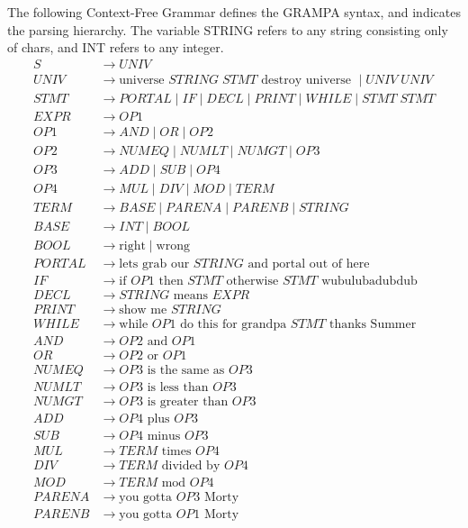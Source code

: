 \documentclass[numbers]{sigplanconf}
\begin{document}
The following Context-Free Grammar defines the GRAMPA syntax, and indicates the parsing hierarchy. The variable STRING refers to any string consisting only of chars, and INT refers to any integer.
\begin{align*}
	S &\rightarrow UNIV \\
	UNIV &\rightarrow \text{universe } STRING \; STMT \text{ destroy universe } \mid UNIV \; UNIV \\
	STMT &\rightarrow PORTAL \mid IF \mid DECL \mid PRINT \mid WHILE \mid STMT \; STMT \\
	EXPR &\rightarrow OP1 \\
	OP1 &\rightarrow AND \mid OR \mid OP2 \\
	OP2 &\rightarrow NUMEQ \mid NUMLT \mid NUMGT \mid OP3 \\
	OP3 &\rightarrow ADD \mid SUB \mid OP4 \\
	OP4 &\rightarrow MUL \mid DIV \mid MOD \mid TERM \\
	TERM &\rightarrow BASE \mid PARENA \mid PARENB \mid STRING \\
	BASE &\rightarrow INT \mid BOOL \\
	BOOL &\rightarrow \text{right} \mid \text{wrong} \\
	PORTAL &\rightarrow \text{lets grab our } STRING \text{ and portal out of here}\\
	IF &\rightarrow \text{if } OP1 \text{ then } STMT \text{ otherwise } STMT \text{ wubulubadubdub}\\
	DECL &\rightarrow STRING \text{ means } EXPR\\
	PRINT &\rightarrow \text{show me } STRING\\
	WHILE &\rightarrow \text{while } OP1 \text{ do this for grandpa } STMT \text{ thanks Summer}\\
	AND &\rightarrow OP2 \text{ and } OP1\\
	OR &\rightarrow OP2 \text{ or } OP1\\
	NUMEQ &\rightarrow OP3 \text{ is the same as } OP3 \\
	NUMLT &\rightarrow OP3 \text{ is less than } OP3\\
	NUMGT &\rightarrow OP3 \text{ is greater than } OP3\\
	ADD &\rightarrow OP4 \text{ plus } OP3\\
	SUB &\rightarrow OP4 \text{ minus } OP3\\
	MUL &\rightarrow TERM \text{ times } OP4\\
	DIV &\rightarrow TERM \text{ divided by } OP4\\
	MOD &\rightarrow TERM \text{ mod } OP4\\
	PARENA &\rightarrow \text{you gotta } OP3 \text{ Morty}\\
	PARENB &\rightarrow \text{you gotta } OP1 \text{ Morty}\\
\end{align*}
\end{document}
